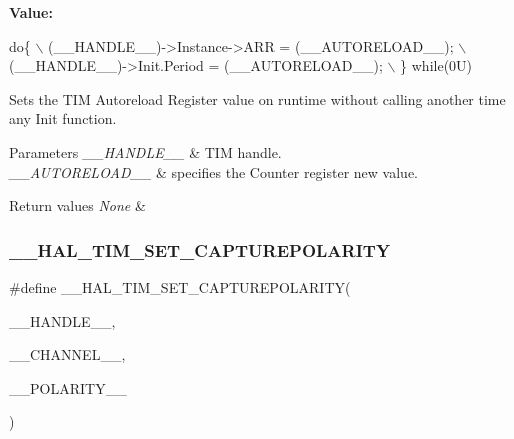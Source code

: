 {\bfseries Value\+:}
\begin{DoxyCode}
\textcolor{keywordflow}{do}\{                                                  \(\backslash\)
                            (\_\_HANDLE\_\_)->Instance->ARR = (\_\_AUTORELOAD\_\_);  \(\backslash\)
                            (\_\_HANDLE\_\_)->Init.Period = (\_\_AUTORELOAD\_\_);    \(\backslash\)
                          \} \textcolor{keywordflow}{while}(0U)
\end{DoxyCode}


Sets the T\+IM Autoreload Register value on runtime without calling another time any Init function. 


\begin{DoxyParams}{Parameters}
{\em \+\_\+\+\_\+\+H\+A\+N\+D\+L\+E\+\_\+\+\_\+} & T\+IM handle. \\
\hline
{\em \+\_\+\+\_\+\+A\+U\+T\+O\+R\+E\+L\+O\+A\+D\+\_\+\+\_\+} & specifies the Counter register new value. \\
\hline
\end{DoxyParams}

\begin{DoxyRetVals}{Return values}
{\em None} & \\
\hline
\end{DoxyRetVals}
\mbox{\label{group___t_i_m___exported___macros_gac5d6989516caa67fae23a9329228cdc7}} 
\subsubsection{\texorpdfstring{\+\_\+\+\_\+\+H\+A\+L\+\_\+\+T\+I\+M\+\_\+\+S\+E\+T\+\_\+\+C\+A\+P\+T\+U\+R\+E\+P\+O\+L\+A\+R\+I\+TY}{\_\_HAL\_TIM\_SET\_CAPTUREPOLARITY}}
{\footnotesize\ttfamily \#define \+\_\+\+\_\+\+H\+A\+L\+\_\+\+T\+I\+M\+\_\+\+S\+E\+T\+\_\+\+C\+A\+P\+T\+U\+R\+E\+P\+O\+L\+A\+R\+I\+TY(\begin{DoxyParamCaption}\item[{}]{\+\_\+\+\_\+\+H\+A\+N\+D\+L\+E\+\_\+\+\_\+,  }\item[{}]{\+\_\+\+\_\+\+C\+H\+A\+N\+N\+E\+L\+\_\+\+\_\+,  }\item[{}]{\+\_\+\+\_\+\+P\+O\+L\+A\+R\+I\+T\+Y\+\_\+\+\_\+ }\end{DoxyParamCaption})}

